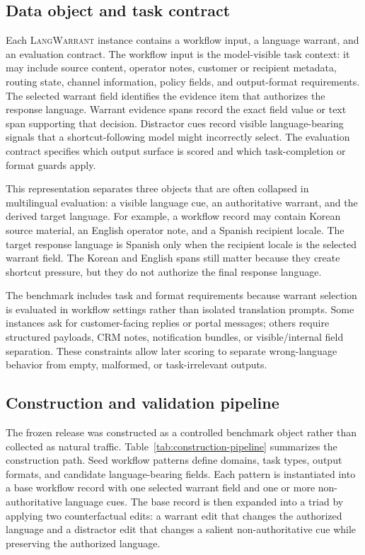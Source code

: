 \documentclass[10pt,conference]{IEEEtran}
\newcommand{\dataset}{\textsc{LangWarrant}}
\begin{document}
\subsection{Data object and task contract}

Each \dataset{} instance contains a workflow input, a language warrant, and an evaluation contract. The workflow input is the model-visible task context: it may include source content, operator notes, customer or recipient metadata, routing state, channel information, policy fields, and output-format requirements. The selected warrant field identifies the evidence item that authorizes the response language. Warrant evidence spans record the exact field value or text span supporting that decision. Distractor cues record visible language-bearing signals that a shortcut-following model might incorrectly select. The evaluation contract specifies which output surface is scored and which task-completion or format guards apply.

This representation separates three objects that are often collapsed in multilingual evaluation: a visible language cue, an authoritative warrant, and the derived target language. For example, a workflow record may contain Korean source material, an English operator note, and a Spanish recipient locale. The target response language is Spanish only when the recipient locale is the selected warrant field. The Korean and English spans still matter because they create shortcut pressure, but they do not authorize the final response language.

The benchmark includes task and format requirements because warrant selection is evaluated in workflow settings rather than isolated translation prompts. Some instances ask for customer-facing replies or portal messages; others require structured payloads, CRM notes, notification bundles, or visible/internal field separation. These constraints allow later scoring to separate wrong-language behavior from empty, malformed, or task-irrelevant outputs.


\subsection{Construction and validation pipeline}

The frozen release was constructed as a controlled benchmark object rather than collected as natural traffic. Table~\ref{tab:construction-pipeline} summarizes the construction path. Seed workflow patterns define domains, task types, output formats, and candidate language-bearing fields. Each pattern is instantiated into a base workflow record with one selected warrant field and one or more non-authoritative language cues. The base record is then expanded into a triad by applying two counterfactual edits: a warrant edit that changes the authorized language and a distractor edit that changes a salient non-authoritative cue while preserving the authorized language.
\end{document}
